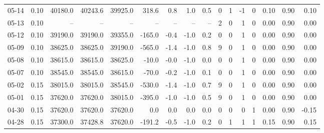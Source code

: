 \begin{threeparttable}
{\begin{tabular}{lrrrrrrrrrrrrrrr}
  05-14 &     0.10 & 40180.0 & 40243.6 & 39925.0 &      318.6 &            0.8 &                      1.0 &                 0.5 &              0 &         1 &    -1 &         0 &       0.10 &      0.90 &           0.10 \\
  05-13 &     0.10 &      -- &      -- &      -- &         -- &             -- &                       -- &                  -- &              2 &         0 &     1 &         0 &       0.00 &      0.90 &           0.00 \\
  05-12 &     0.10 & 39190.0 & 39190.0 & 39355.0 &     -165.0 &           -0.4 &                     -1.0 &                 0.2 &              0 &         0 &     1 &         0 &       0.00 &      0.90 &           0.00 \\
  05-09 &     0.10 & 38625.0 & 38625.0 & 39190.0 &     -565.0 &           -1.4 &                     -1.0 &                 0.8 &              9 &         0 &     1 &         0 &       0.00 &      0.90 &           0.00 \\
  05-08 &     0.10 & 38615.0 & 38615.0 & 38625.0 &      -10.0 &           -0.0 &                     -1.0 &                 0.0 &              0 &         0 &     1 &         0 &       0.00 &      0.90 &           0.00 \\
  05-07 &     0.10 & 38545.0 & 38545.0 & 38615.0 &      -70.0 &           -0.2 &                     -1.0 &                 0.1 &              0 &         0 &     1 &         0 &       0.00 &      0.90 &           0.00 \\
  05-02 &     0.15 & 38015.0 & 38015.0 & 38545.0 &     -530.0 &           -1.4 &                     -1.0 &                 0.7 &              9 &         0 &     1 &         0 &       0.00 &      0.90 &           0.00 \\
  05-01 &     0.15 & 37620.0 & 37620.0 & 38015.0 &     -395.0 &           -1.0 &                     -1.0 &                 0.5 &              9 &         0 &     1 &         0 &       0.00 &      0.90 &           0.00 \\
  04-30 &     0.15 & 37620.0 & 37620.0 & 37620.0 &        0.0 &            0.0 &                      0.0 &                 0.0 &              0 &         0 &     0 &         1 &       0.00 &      0.90 &          -0.15 \\
  04-28 &     0.15 & 37300.0 & 37428.8 & 37620.0 &     -191.2 &           -0.5 &                     -1.0 &                 0.2 &              0 &         1 &     1 &         1 &       0.15 &      0.90 &           0.15 \\

\end{tabular}}
\end{threeparttable}
